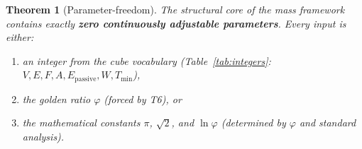 \documentclass[11pt,a4paper]{article}
\newtheorem{theorem}{Theorem}[section]
\theoremstyle{definition}
\theoremstyle{remark}
\newcommand{\phig}{\varphi}
\newcommand{\Epass}{E_{\mathrm{passive}}}
\begin{document}
\begin{theorem}[Parameter-freedom]
\label{thm:no_params}
The structural core of the mass framework contains exactly
\textbf{zero continuously adjustable parameters}.  Every input is either:
\begin{enumerate}[nosep,label=(\roman*)]
  \item an integer from the cube vocabulary
        (Table~\ref{tab:integers}: $V, E, F, A, \Epass, W, T_{\min}$),
  \item the golden ratio $\phig$ (forced by T6), or
  \item the mathematical constants $\pi$, $\sqrt{2}$, and $\ln\phig$
        (determined by $\phig$ and standard analysis).
\end{enumerate}
\end{theorem}
\end{document}
